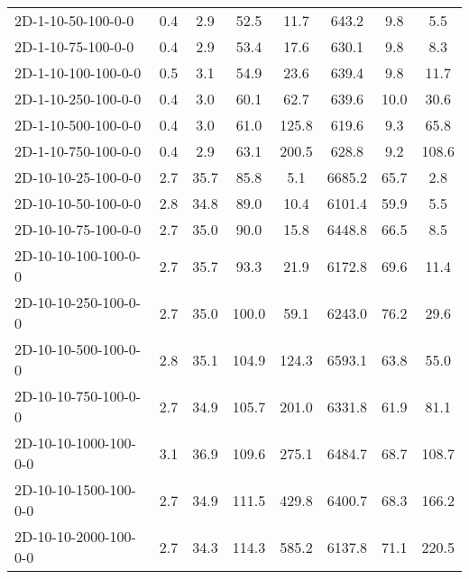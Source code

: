 \documentclass{article}
\begin{document}
\begin{table}[h]
\begin{center}
\begin{tabular}{|l||c|c|c|c|c|c|c|}
            2D-1-10-50-100-0-0             & 0.4  & 2.9       & 52.5       & 11.7        & 643.2    & 9.8       & 5.5        \\
            2D-1-10-75-100-0-0             & 0.4  & 2.9       & 53.4       & 17.6        & 630.1    & 9.8       & 8.3        \\
            2D-1-10-100-100-0-0            & 0.5  & 3.1       & 54.9       & 23.6        & 639.4    & 9.8       & 11.7       \\
            2D-1-10-250-100-0-0            & 0.4  & 3.0       & 60.1       & 62.7        & 639.6    & 10.0      & 30.6       \\
            2D-1-10-500-100-0-0            & 0.4  & 3.0       & 61.0       & 125.8       & 619.6    & 9.3       & 65.8       \\
            2D-1-10-750-100-0-0            & 0.4  & 2.9       & 63.1       & 200.5       & 628.8    & 9.2       & 108.6      \\
            \hline
            2D-10-10-25-100-0-0            & 2.7  & 35.7      & 85.8       & 5.1         & 6685.2   & 65.7      & 2.8        \\
            2D-10-10-50-100-0-0            & 2.8  & 34.8      & 89.0       & 10.4        & 6101.4   & 59.9      & 5.5        \\
            2D-10-10-75-100-0-0            & 2.7  & 35.0      & 90.0       & 15.8        & 6448.8   & 66.5      & 8.5        \\
            2D-10-10-100-100-0-0           & 2.7  & 35.7      & 93.3       & 21.9        & 6172.8   & 69.6      & 11.4       \\
            2D-10-10-250-100-0-0           & 2.7  & 35.0      & 100.0      & 59.1        & 6243.0   & 76.2      & 29.6       \\
            2D-10-10-500-100-0-0           & 2.8  & 35.1      & 104.9      & 124.3       & 6593.1   & 63.8      & 55.0       \\
            2D-10-10-750-100-0-0           & 2.7  & 34.9      & 105.7      & 201.0       & 6331.8   & 61.9      & 81.1       \\
            2D-10-10-1000-100-0-0          & 3.1  & 36.9      & 109.6      & 275.1       & 6484.7   & 68.7      & 108.7      \\
            2D-10-10-1500-100-0-0          & 2.7  & 34.9      & 111.5      & 429.8       & 6400.7   & 68.3      & 166.2      \\
            2D-10-10-2000-100-0-0          & 2.7  & 34.3      & 114.3      & 585.2       & 6137.8   & 71.1      & 220.5      \\

\end{tabular}
\end{center}
\end{table}
\end{document}
